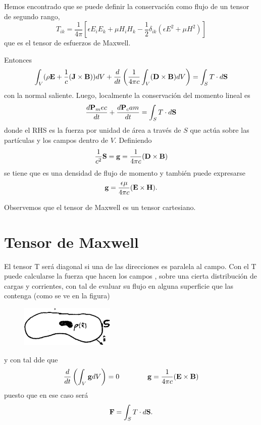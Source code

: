 \documentclass[10pt,oneside]{CBFT_book}
\begin{document}
Hemos encontrado que se puede definir la conservación como flujo de un tensor de segundo rango,
\[
	T_{ik} = \frac{1}{4\pi}\left[ \epsilon E_iE_k + \mu H_iH_k - \frac{1}{2}\delta_{ik}
	( \epsilon E^2 + \mu H^2)\right]
\]
que es el tensor de esfuerzos de Maxwell.

Entonces
\[
	\int_V (\rho\vb{E} + \frac{1}{c}(\pv{J}{B}) ) dV + 
	\dtot{}{t}\left( \frac{1}{4\pi c}\int_V (\pv{D}{B})dV\right) = \int_S T \cdot d\vb{S}
\]
con la normal saliente. Luego, localmente la conservación del momento lineal es
\[
	\dtot{\vb{P}_mec}{t} + \dtot{\vb{P}_cam}{t}  = \int_S T \cdot d\vb{S}
\]
donde el RHS es la fuerza por unidad de área a través de $S$ que actúa sobre las partículas y
los campos dentro de $V$.
Definiendo
\[
	\frac{1}{c^2} \vb{S}=  \vb{g} = \frac{1}{4\pi c}(\pv{D}{B})
\]
se tiene que  es una densidad de flujo de momento y también puede expresarse
\[
	\vb{g} = \frac{\epsilon\mu}{4\pi c}(\pv{E}{H}).
\]

Observemos que el tensor de Maxwell es un tensor cartesiano.



\section{Tensor de Maxwell}

El tensor T será diagonal si una de las direcciones es paralela al campo. Con el T puede calcularse
la fuerza que hacen los campos ,  sobre una cierta distribución de cargas y corrientes,
con tal de evaluar su flujo en alguna superficie que las contenga (como se ve en la figura)
\begin{figure}[htb]
	\begin{center}
	\includegraphics[width=0.4\textwidth]{images/fig_ft1_maxwell.pdf}	 
	\end{center}
	\caption{}
\end{figure} 
y con tal dde que 
\[
	\dtot{}{t}\left(\int_V \vb{g} dV \right) = 0 \qquad \qquad \vb{g} =  \frac{1}{4\pi c}(\pv{E}{B})
\]
puesto que en ese caso será
\[
	\vb{F} = \int_S T \cdot d\vb{S}.
\]
\end{document}
